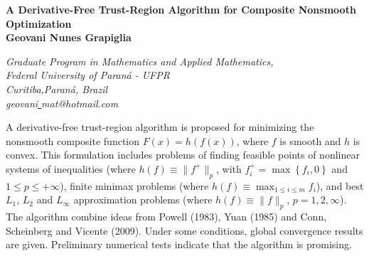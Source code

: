 \documentclass[12pt]{article}
\begin{document}
\begin{center}
\textbf{\large A Derivative-Free Trust-Region Algorithm for Composite Nonsmooth Optimization}
\\

\vskip 5mm \textbf{Geovani Nunes Grapiglia}

\vskip 8mm
\emph{Graduate Program in Mathematics and
Applied Mathematics,\\
Federal University of Paran\'a - UFPR\\
 Curitiba,Paran\'a, Brazil\\
 \vskip 3mm
geovani\underline{ }mat@hotmail.com}

 
\end{center}


A derivative-free trust-region algorithm is proposed for minimizing the nonsmooth composite function $F(x)=h(f(x))$, where $f$ is smooth and $h$ is convex. This formulation includes pro\-blems of finding feasible points of nonlinear systems of inequalities (where $h(f)\equiv\|f^{+}\|_{p}$, with $f_{i}^{+}=\max\left\{f_{i},0\right\}$ and $1\leq p \leq+\infty$), finite minimax pro\-blems (where $h(f)\equiv\max_{1\leq i\leq m}f_{i}$), and best $L_{1}$, $L_{2}$ and $L_{\infty}$ approximation pro\-blems (where $h(f)\equiv\|f\|_{p}$, $p=1,2,\infty$). The algorithm combine ideas from Powell (1983), Yuan (1985) and Conn, Scheinberg and Vicente (2009). Under some conditions, global convergence results are given. Preliminary numerical tests indicate that the algorithm is promising.

\end{document}
